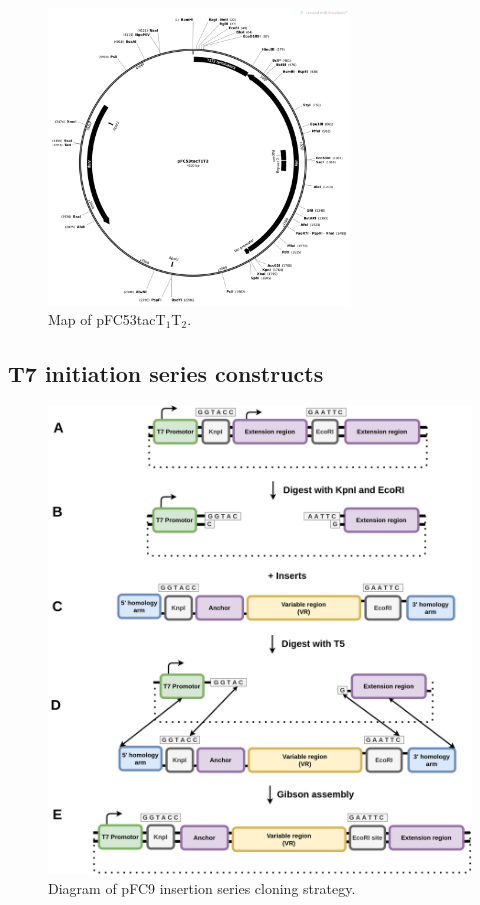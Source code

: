 \documentclass[11pt]{article}
\begin{document}
\begin{figure}[H]
	\includegraphics[width=8cm]{images/plasmid_maps/pFC53tacT1T2_Map.png}
	\centering
	\caption{Map of pFC53tacT$_1$T$_2$.}
	\label{fig:map_pFC53tacT1T2}
\end{figure}




\subsection{T7 initiation series constructs}
\label{T7:init} 


\begin{figure}[H]
	\includegraphics[width=15cm]{images/cloning_diagrams/construct_diagrams-T7-Initiation-series.png}
	\centering
	\caption{Diagram of pFC9 insertion series cloning strategy.}
	\label{clone:T7-insert}
\end{figure}
\end{document}
